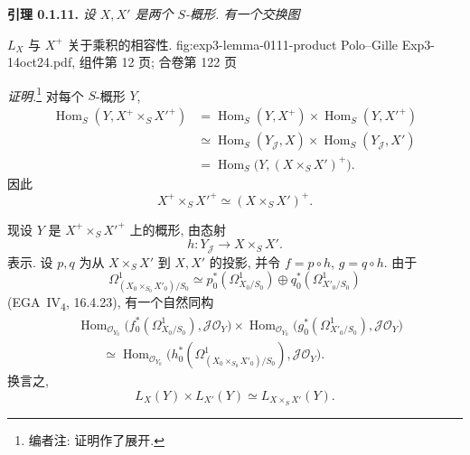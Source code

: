 
\setcounter{footnote}{17}

\medskip
\noindent{}\textbf{引理 0.1.11.}
\textit{设 \(X,X'\) 是两个 \(S\)-概形. 有一个交换图}

  {\(L_X\) 与 \(X^+\) 关于乘积的相容性.}
  {fig:exp3-lemma-0111-product}
  {Polo--Gille Exp3-14oct24.pdf, 组件第 12 页; 合卷第 122 页}

\textit{证明.}\footnote{编者注: 证明作了展开.}
对每个 \(S\)-概形 \(Y\),
\[
\begin{aligned}
 \operatorname{Hom}_S(Y,X^+\times_S X'^+)
 &=
 \operatorname{Hom}_S(Y,X^+)
 \times\operatorname{Hom}_S(Y,X'^+)\\
 &\simeq
 \operatorname{Hom}_S(Y_{\mathscr J},X)
 \times\operatorname{Hom}_S(Y_{\mathscr J},X')\\
 &=
 \operatorname{Hom}_S\bigl(Y,(X\times_S X')^+\bigr).
\end{aligned}
\]
因此
\[
 X^+\times_S X'^+\simeq(X\times_S X')^+.
\]

现设 \(Y\) 是 \(X^+\times_S X'^+\) 上的概形, 由态射
\[
 h:Y_{\mathscr J}\longrightarrow X\times_S X'.
\]
表示. 设 \(p,q\) 为从 \(X\times_S X'\) 到 \(X,X'\) 的投影,
并令 \(f=p\circ h\), \(g=q\circ h\). 由于
\[
 \Omega^1_{(X_0\times_{S_0}X'_0)/S_0}
 \simeq
 p_0^*(\Omega^1_{X_0/S_0})
 \oplus q_0^*(\Omega^1_{X'_0/S_0})
\]
(EGA~IV\textsubscript{4}, 16.4.23), 有一个自然同构
\[
\begin{aligned}
 &\operatorname{Hom}_{\mathscr O_{Y_0}}
   \bigl(f_0^*(\Omega^1_{X_0/S_0}),\mathscr J\mathscr O_Y\bigr)
 \times
 \operatorname{Hom}_{\mathscr O_{Y_0}}
   \bigl(g_0^*(\Omega^1_{X'_0/S_0}),\mathscr J\mathscr O_Y\bigr)\\
 &\qquad\simeq
 \operatorname{Hom}_{\mathscr O_{Y_0}}
 \bigl(h_0^*(\Omega^1_{(X_0\times_{S_0}X'_0)/S_0}),
       \mathscr J\mathscr O_Y\bigr).
\end{aligned}
\]
换言之,
\[
 L_X(Y)\times L_{X'}(Y)\simeq L_{X\times_S X'}(Y).
\]

